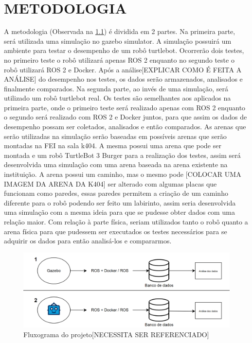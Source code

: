 \chapter{METODOLOGIA}

A metodologia (Observada na \ref{fig:Fluxograma}) é dividida em 2 partes. Na primeira parte, será utilizada uma simulação no gazebo simulator. A simulação possuirá um ambiente para testar o desempenho de um robô turtlebot. Ocorrerão dois testes, no primeiro teste o robô utilizará apenas ROS 2 enquanto no segundo teste o robô utilizará ROS 2 e Docker. Após a análise[EXPLICAR COMO É FEITA A ANÁLISE] do desempenho nos testes, os dados serão armazenados, analisados e finalmente comparados.
Na segunda parte, ao invés de uma simulação, será utilizado um robô turtlebot real. Os testes são semelhantes aos aplicados na primeira parte, onde o primeiro teste será realizado apenas com ROS 2 enquanto o segundo será realizado com ROS 2 e Docker juntos, para que assim os dados de desempenho possam ser coletados, analisados e então comparados.
As arenas que serão utilizadas na simulação serão baseadas em possíveis arenas que serão montadas na FEI na sala k404. A mesma possui uma arena que pode ser montada e um robô TurtleBot 3 Burger para a realização dos testes, assim será desenvolvida uma simulação com uma arena baseada na arena existente na instituição. A arena possui um caminho, mas o mesmo pode [COLOCAR UMA IMAGEM DA ARENA DA K404] ser alterado com algumas placas que funcionam como paredes, essas paredes permitem a criação de um caminho diferente para o robô podendo ser feito um labirinto, assim seria desenvolvida uma simulação com a mesma ideia para que se pudesse obter dados com uma relação maior. Com relação à parte física, seriam utilizados tanto o robô quanto a arena física para que pudessem ser executados os testes necessários para se adquirir os dados para então analisá-los e compararmos.

\begin{figure}[htb]
    \centering
    \includegraphics[width=0.9\linewidth]{Figures/FluxogramaTCC.png}
    \caption{Fluxograma do projeto[NECESSITA SER REFERENCIADO]}
    \label{fig:Fluxograma}
\end{figure}